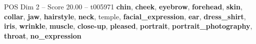\begin{textsample}{POS Dim 2 – Score 20.00 – t005971}  \label{ex:f2_pos_030}
\textbf{chin}, \textbf{cheek}, \textbf{eyebrow}, \textbf{forehead}, \textbf{skin}, \textbf{collar}, \textbf{jaw}, \textbf{hairstyle}, \textbf{neck}, temple, \textbf{facial\_expression}, \textbf{ear}, \textbf{dress\_shirt}, \textbf{iris}, \textbf{wrinkle}, \textbf{muscle}, \textbf{close-up}, \textbf{pleased}, \textbf{portrait}, \textbf{portrait\_photography}, \textbf{throat}, \textbf{no\_expression}

\end{textsample}
